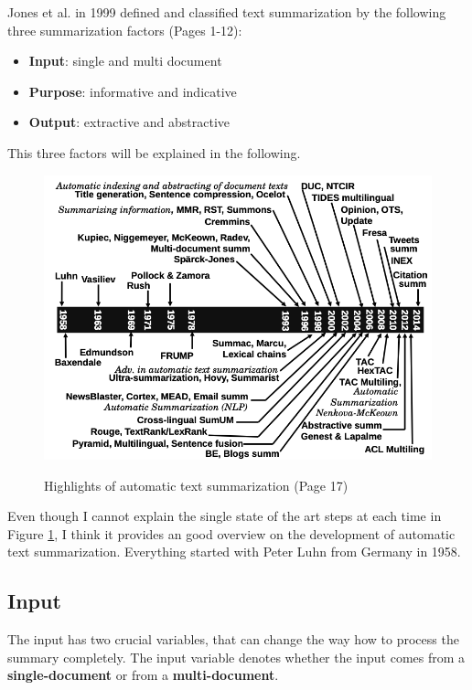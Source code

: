 Jones et al. in 1999 defined and classified text summarization by the following three summarization factors \cite{Jones98automaticsummarising:} (Pages 1-12):

\begin{itemize}
	\item \textbf{Input}: single and multi document
	\item \textbf{Purpose}: informative and indicative
	\item \textbf{Output}: extractive and abstractive
\end{itemize}

This three factors will be explained in the following.

\begin{figure}
	\begin{center}
		\includegraphics[width=5.5in]{photos/history}\\
		\caption{Highlights of automatic text summarization \cite{juan} (Page 17)}\label{hist}
	\end{center}
\end{figure}

Even though I cannot explain the single state of the art steps at each time in Figure \ref{hist}, I think it provides an good overview on the development of automatic text summarization. Everything started with Peter Luhn from Germany in 1958.

\subsection{Input}\label{ss:input}

The input has two crucial variables, that can change the way how to process the summary completely. The input variable denotes whether the input comes from a \textbf{single-document} or from a \textbf{multi-document}. 


